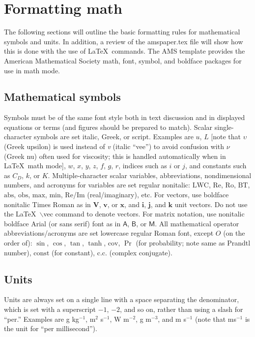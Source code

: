 \documentclass{ametsocV6.1}
\begin{document}
\section{Formatting math}
The following sections will outline the basic formatting rules for
mathematical symbols and units.  In addition, a review of the amspaper.tex
file will show how this is done with the use of \LaTeX\ commands.  The AMS
template provides the American Mathematical Society math, font, symbol, and
boldface packages for use in math mode.

\subsection{Mathematical symbols}
Symbols must be of the same font style both in text discussion and in
displayed equations or terms (and figures should be prepared to match).
Scalar single-character symbols are set italic, Greek, or script. Examples
are $u$, $L$ [note that $\upsilon$ (Greek upsilon) is used instead of
\textit{v} (italic ``vee'') to avoid confusion with $\nu$ (Greek nu) often
used for viscosity; this is handled automatically when in \LaTeX\ math mode],
$w$, $x$, $y$, $z$, $f$, $g$, $r$, indices such as $i$ or $j$, and constants
such as $C_D$, $k$, or $K$. Multiple-character scalar variables,
abbreviations, nondimensional numbers, and acronyms for variables are set
regular nonitalic: $\mathrm{LWC}$, $\mathrm{Re}$, $\mathrm{Ro}$,
$\mathrm{BT}$, $\mathrm{abs}$, $\mathrm{obs}$, $\mathrm{max}$,
$\mathrm{min}$, $\mathrm{Re}$/$\mathrm{Im}$ (real/imaginary), etc. For
vectors, use boldface nonitalic Times Roman as in $\mathbf{V}$, $\mathbf{v}$,
or $\mathbf{x}$, and $\mathbf{i}$, $\mathbf{j}$, and $\mathbf{k}$ unit
vectors. Do not use the \LaTeX\ $\backslash$vec command to denote vectors.
For matrix notation, use nonitalic boldface Arial (or sans serif) font as in
$\bm{\mathsf{A}}$, $\bm{\mathsf{B}}$, or $\bm{\mathsf{M}}$.  All mathematical
operator abbreviations/acronyms are set lowercase regular Roman font, except
$O$ (on the order of): $\sin$, $\cos$, $\tan$, $\tanh$, $\mathrm{cov}$, $\Pr$
(for probability; note same as Prandtl number), $\mathrm{const}$ (for
constant), $\mathrm{c.c.}$ (complex conjugate).

\subsection{Units}
Units are always set on a single line with a space separating the
denominator, which is set with a superscript $-1$, $-2$, and so on, rather
than using a slash for ``per.'' Examples are g kg$^{-1}$, m$^2$ s$^{-1}$, W
m$^{-2}$, g m$^{-3}$, and m s$^{-1}$ (note that ms$^{-1}$ is the unit for
``per millisecond'').
\end{document}
